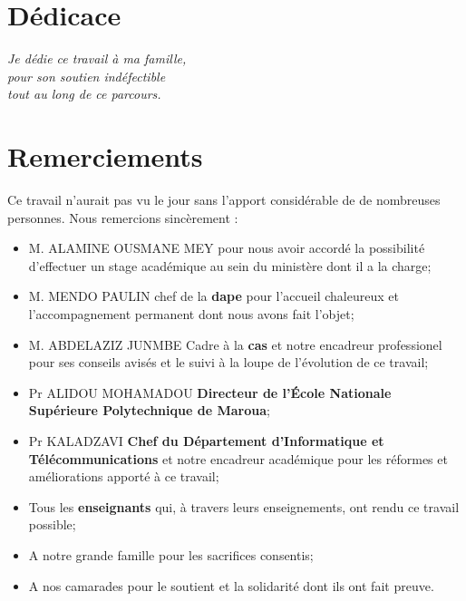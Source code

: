 \documentclass[12pt, a4paper, oneside]{report}
\begin{document}
	\pagenumbering{roman}
	\setcounter{page}{1}
	
	\chapter*{Dédicace}
	\thispagestyle{plain}
	
	\vspace{4cm}
	\begin{flushright}
		\begin{minipage}{0.6\textwidth}
			\itshape\large
			Je dédie ce travail à ma famille,\\[6pt]
			pour son soutien indéfectible\\
			tout au long de ce parcours.
		\end{minipage}
	\end{flushright}
	\vfill
	
	\chapter*{Remerciements}
	\thispagestyle{plain}
	Ce travail n'aurait pas vu le jour sans l'apport considérable de 
	de nombreuses personnes. Nous remercions sincèrement :
	
	\begin{itemize}
		\item M. ALAMINE OUSMANE MEY pour nous avoir accordé la possibilité d'effectuer un stage académique au sein du ministère dont il a la charge;
		\item M. MENDO PAULIN chef de la \textbf{\gls{dape}} pour l'accueil chaleureux et l'accompagnement permanent dont nous avons fait l'objet;
		\item M. ABDELAZIZ JUNMBE Cadre à la \textbf{\gls{cas}} et notre encadreur professionel pour ses conseils avisés et le suivi à la loupe de l'évolution de ce travail;
		\item Pr ALIDOU MOHAMADOU \textbf{Directeur de l'École Nationale Supérieure Polytechnique de Maroua};
		\item Pr KALADZAVI  \textbf{Chef du Département d'Informatique et Télécommunications} et notre encadreur académique pour les réformes et améliorations apporté à ce travail;
		\item Tous les \textbf{enseignants} qui, à travers leurs enseignements, ont rendu ce travail possible;
		\item A notre grande famille pour les sacrifices consentis;
		\item A nos camarades pour le soutient et la solidarité dont ils ont fait preuve.
	\end{itemize}
	
\end{document}

